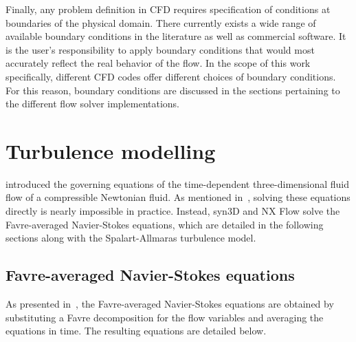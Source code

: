 %
Finally, any problem definition in CFD requires specification of conditions at boundaries of the physical domain. There currently exists a wide range of available boundary conditions in the literature as well as commercial software. It is the user's responsibility to apply boundary conditions that would most accurately reflect the real behavior of the flow. In the scope of this work specifically, different CFD codes offer different choices of boundary conditions. For this reason, boundary conditions are discussed in the sections pertaining to the different flow solver implementations.
%
%
\section{Turbulence modelling}
\label{sec:turb}
%
 introduced the governing equations of the time-dependent three-dimensional fluid flow of a compressible Newtonian fluid. As mentioned in~, solving these equations directly is nearly impossible in practice. Instead, syn3D and NX Flow solve the Favre-averaged Navier-Stokes equations, which are detailed in the following sections along with the Spalart-Allmaras turbulence model.
%
\subsection{Favre-averaged Navier-Stokes equations}
\label{sec:fans}
%
As presented in~, the Favre-averaged Navier-Stokes equations are obtained by substituting a Favre decomposition for the flow variables and averaging the equations in time. The resulting equations are detailed below.

%
